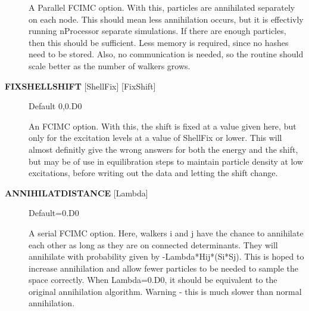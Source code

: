 \documentclass[openany,a4paper,10pt]{manual}
\begin{document}
\begin{description}
A Parallel FCIMC option. With this, particles are annihilated separately on each node.
This should mean less annihilation occurs, but it is effectivly running nProcessor
separate simulations. If there are enough particles, then this should be sufficient.
Less memory is required, since no hashes need to be stored. Also, no communication is
needed, so the routine should scale better as the number of walkers grows.

\item[\textbf{FIXSHELLSHIFT} {[}ShellFix{]} {[}FixShift{]}]
Default 0,0.D0

An FCIMC option. With this, the shift is fixed at a value given here,
but only for the excitation levels at a value of ShellFix or lower. This will
almost definitly give the wrong answers for both the energy and the shift,
but may be of use in equilibration steps to maintain particle density at
low excitations, before writing out the data and letting the shift change.

\item[\textbf{ANNIHILATDISTANCE} {[}Lambda{]}]
Default=0.D0

A serial FCIMC option. Here, walkers i and j have the chance to annihilate each other
as long as they are on connected determinants. They will annihilate with probability
given by -Lambda*Hij*(Si*Sj). This is hoped to increase annihilation and allow fewer
particles to be needed to sample the space correctly. When Lambda=0.D0, it should be
equivalent to the original annihilation algorithm. Warning - this is much slower than
normal annihilation.

\end{description}
\end{document}
